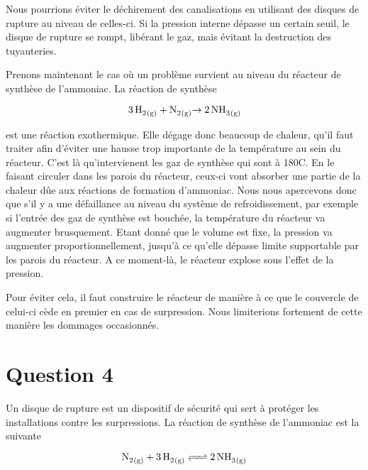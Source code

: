 \documentclass[a4paper,oneside,12pt]{article}
\begin{document}
Nous pourrions éviter le déchirement des canalisations en utilisant des disques de rupture au niveau de celles-ci. Si la pression interne dépasse un certain seuil, le disque de rupture se rompt, libérant le gaz, mais évitant la destruction des tuyauteries.
\newline

Prenons maintenant le cas où un problème survient au niveau du réacteur de synthèse de l'ammoniac. La réaction de synthèse

\begin{equation*}
	\ce{3 \, H2_{(g)} + N2_{(g)} \rightarrow {2} \, NH3_{(g)}} 
\end{equation*}

est une réaction exothermique. Elle dégage donc beaucoup de chaleur, qu'il faut traiter afin d'éviter une hausse trop importante de la température au sein du réacteur. C'est là qu'intervienent les gaz de synthèse  qui sont à 180{\degre}C. En le faisant circuler dans les parois du réacteur, ceux-ci vont absorber une partie de la chaleur dûe aux réactions de formation d'ammoniac. Nous nous apercevons donc que s'il y a une défaillance au niveau du système de refroidissement, par exemple si l'entrée des gaz de synthèse est bouchée, la température du réacteur va augmenter brusquement. Etant donné que le volume est fixe, la pression va augmenter proportionnellement, jusqu'à ce qu'elle dépasse limite supportable par les parois du réacteur. A ce moment-là, le réacteur explose sous l'effet de la pression.
\newline

Pour éviter cela, il faut construire le réacteur de manière à ce que le couvercle de celui-ci cède en premier en cas de surpression. Nous limiterions fortement de cette manière les dommages occasionnés.

\section*{Question 4}

Un disque de rupture est un dispositif de sécurité qui sert à protéger les installations 
contre les surpressions.
La réaction de synthèse de l'ammoniac est la suivante

\[
	\ce{N2_{(g)} + 3H2_{(g)} <=> 2NH3_{(g)}}
\]
\end{document}
